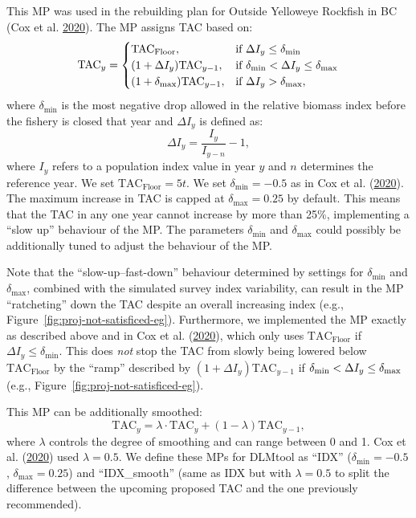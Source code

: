 \documentclass[11pt]{book}
\newcommand{\lt}{\ensuremath <}
\newcommand{\gt}{\ensuremath >}
\begin{document}
This MP was used in the rebuilding plan for Outside Yelloweye Rockfish in BC (Cox et al. \protect\hyperlink{ref-cox2020}{2020}). The MP assigns TAC based on:
\begin{equation}
\textrm{TAC}_y =
\begin{cases}
\textrm{TAC}_\textrm{Floor}, & \textrm{if}\ \Delta I_y \leq \delta_\textrm{min} \\
(1 + \Delta I_y ) \textrm{TAC}_{y-1}, & \textrm{if}\ \delta_\textrm{min} \lt \Delta I_y \leq \delta_\textrm{max} \\
(1 + \delta_\textrm{max}) \textrm{TAC}_{y-1}, & \textrm{if}\ \Delta I_y \gt \delta_\textrm{max},
\end{cases}
\end{equation}
where \(\delta_\textrm{min}\) is the most negative drop allowed in the relative biomass index before the fishery is closed that year and \(\Delta I_y\) is defined as:
\begin{equation}
\Delta I_y = \frac{I_y}{I_{y-n}} - 1,
\end{equation}
where \(I_y\) refers to a population index value in year \(y\) and \(n\) determines the reference year. We set \(\textrm{TAC}_\textrm{Floor} = 5 t\). We set \(\delta_\textrm{min} = -0.5\) as in Cox et al. (\protect\hyperlink{ref-cox2020}{2020}). The maximum increase in TAC is capped at \(\delta_\textrm{max} = 0.25\) by default. This means that the TAC in any one year cannot increase by more than 25\%, implementing a ``slow up'' behaviour of the MP. The parameters \(\delta_\textrm{min}\) and \(\delta_\textrm{max}\) could possibly be additionally tuned to adjust the behaviour of the MP.

Note that the ``slow-up--fast-down'' behaviour determined by settings for \(\delta_\textrm{min}\) and \(\delta_\textrm{max}\), combined with the simulated survey index variability, can result in the MP ``ratcheting'' down the TAC despite an overall increasing index (e.g., Figure~\ref{fig:proj-not-satisficed-eg}). Furthermore, we implemented the MP exactly as described above and in Cox et al. (\protect\hyperlink{ref-cox2020}{2020}), which only uses \(\textrm{TAC}_\textrm{Floor}\) if \(\Delta I_y \leq \delta_\textrm{min}\). This does \emph{not} stop the TAC from slowly being lowered below \(\textrm{TAC}_\textrm{Floor}\) by the ``ramp'' described by \((1 + \Delta I_y ) \textrm{TAC}_{y-1}\) if \(\delta_\textrm{min} \lt \Delta I_y \leq \delta_\textrm{max}\) (e.g., Figure~\ref{fig:proj-not-satisficed-eg}).

This MP can be additionally smoothed:
\begin{equation}
\textrm{TAC}_y = \lambda \cdot \textrm{TAC}_y + (1-\lambda) \textrm{TAC}_{y-1},
\end{equation}
where \(\lambda\) controls the degree of smoothing and can range between 0 and 1. Cox et al. (\protect\hyperlink{ref-cox2020}{2020}) used \(\lambda=0.5\). We define these MPs for DLMtool as ``IDX'' (\(\delta_{\textrm{min}} = -0.5\), \(\delta_{\textrm{max}} = 0.25\)) and ``IDX\_smooth'' (same as IDX but with \(\lambda = 0.5\) to split the difference between the upcoming proposed TAC and the one previously recommended).
\end{document}
